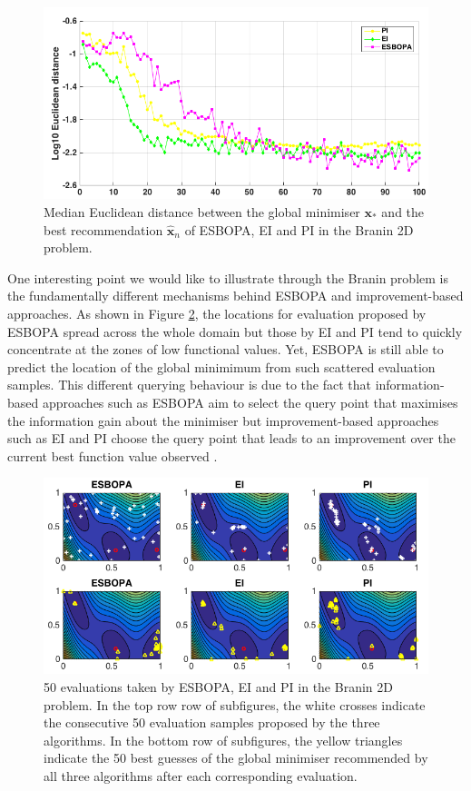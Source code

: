 \documentclass[a4paper,11pt]{report}
\begin{document}
\begin{figure} [H]
\label{2DBraninXnorm2}
	\centering
	 \includegraphics[width=0.8\linewidth]{2DBranin_ESBOPA_V4Xnorm2.png}
\caption{ Median Euclidean distance between the global minimiser $\mathbf{x}_{*}$ and the best recommendation $ \hat{\mathbf{x}}_{n}$ of ESBOPA, EI and PI in the Branin 2D problem.}
\end{figure}
\noindent
One interesting point we would like to illustrate through the Branin problem is the fundamentally different mechanisms behind ESBOPA and improvement-based approaches. As shown in Figure \ref{2Dbraninevaluationpoints}, the locations for evaluation proposed by ESBOPA spread across the whole domain but those by EI and PI tend to quickly concentrate at the zones of low functional values. Yet, ESBOPA is still able to predict the location of the global minimimum from such scattered evaluation samples. This different querying behaviour is due to the fact that information-based approaches such as ESBOPA aim to select the query point that maximises the information gain about the minimiser but improvement-based approaches such as EI and PI choose the query point that leads to an improvement over the current best function value observed \cite{shahriari2016taking}. 
\\
\begin{figure} [H] \label{2Dbraninevaluationpoints}
	\centering
	 \includegraphics[width=1.0\linewidth]{Branin_evaluataions.png}
\caption{ 50 evaluations taken by ESBOPA, EI and PI in the Branin 2D problem. In the top row row of subfigures, the white crosses indicate the consecutive 50 evaluation samples proposed by the three algorithms. In the bottom row of subfigures, the yellow triangles indicate the 50 best guesses of the global minimiser recommended by all three algorithms after each corresponding evaluation.}
\end{figure}
\end{document}
